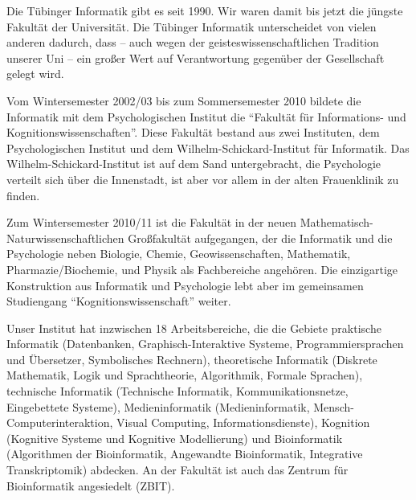 
Die Tübinger Informatik gibt es seit 1990.  Wir waren damit bis jetzt die
  jüngste Fakultät der Universität.
  Die Tübinger Informatik unterscheidet von vielen anderen dadurch, dass -- auch wegen
 der geisteswissenschaftlichen Tradition unserer Uni -- ein
  großer Wert auf Verantwortung gegenüber der Gesellschaft gelegt
  wird.

Vom Wintersemester 2002/03 bis zum Sommersemester 2010 bildete die Informatik
  mit dem Psychologischen Institut die "`Fakultät für Informations- und
  Kognitionswissenschaften"'.  Diese Fakultät bestand aus zwei
  Instituten, dem Psychologischen Institut und dem Wilhelm-Schickard-Institut
  für Informatik. Das Wilhelm-Schickard-Institut ist auf dem Sand
untergebracht, die Psychologie verteilt sich über die Innenstadt, ist aber
vor allem in der alten Frauenklinik zu finden. 

Zum Wintersemester 2010/11 ist die Fakultät in der neuen Mathematisch-
Naturwissenschaftlichen Großfakultät aufgegangen, der die Informatik und
die Psychologie neben Biologie, Chemie, Geowissenschaften, Mathematik,
Pharmazie/Biochemie, und Physik als Fachbereiche angehören. 
Die einzigartige Konstruktion aus Informatik und Psychologie lebt aber
im gemeinsamen Studiengang "`Kognitionswissenschaft"' weiter.

Unser Institut hat inzwischen 18 Arbeitsbereiche, die die Gebiete praktische
Informatik (Datenbanken, Graphisch-Interaktive Systeme, Programmiersprachen
und Übersetzer, Symbolisches Rechnern), theoretische
Informatik (Diskrete Mathematik, Logik und Sprachtheorie, Algorithmik,
Formale Sprachen), technische Informatik
(Technische Informatik, Kommunikationsnetze, Eingebettete Systeme),
Medieninformatik (Medieninformatik, Mensch-Computerinteraktion, Visual Computing, Informationsdienste), Kognition (Kognitive Systeme und Kognitive Modellierung)
und Bioinformatik (Algorithmen der Bioinformatik, Angewandte Bioinformatik, Integrative Transkriptomik) abdecken. 
An der Fakultät ist auch das Zentrum für Bioinformatik angesiedelt (ZBIT).
